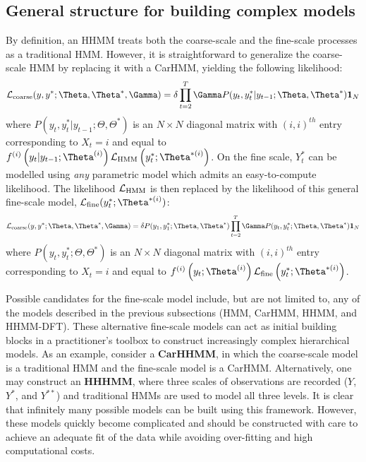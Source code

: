 
\subsection{General structure for building complex models}

By definition, an HHMM treats both the coarse-scale and the fine-scale processes as a traditional HMM. However, it is straightforward to generalize the coarse-scale HMM by replacing it with a CarHMM, yielding the following likelihood:
\[
\calL_{\text{coarse}}(y,y^*;\Theta,\Theta^*,\Gamma) = \delta \prod_{t=2}^T \Gamma P(y_t,y^*_t|y_{t-1};\Theta,\Theta^*) \mathbf{1}_N
\]
where $P(y_t,y^*_t|y_{t-1};\Theta,\Theta^*) $ is an $N \times N$ diagonal matrix with $(i,i)^{th}$ entry corresponding to $X_t=i$ and equal to $f^{(i)}\left(y_t|y_{t-1};\Theta^{(i)}\right)\calL_{\text{HMM}}\left(y^*_t;\Theta^{*(i)}\right)$. 
On the fine scale, $Y^*_t$ can be modelled using \textit{any} parametric model which admits an easy-to-compute likelihood. The likelihood $\mathcal{L}_{\text{HMM}}$ is then replaced by the likelihood of this general fine-scale model, $\calL_{\text{fine}}(y^*_t;\Theta^{*(i)})$:
\[
\calL_{\text{coarse}}(y,y^*;\Theta,\Theta^*,\Gamma) = \delta P(y_1,y^*_1;\Theta,\Theta^*) \prod_{t=2}^T \Gamma P(y_t,y^*_t;\Theta,\Theta^*) \mathbf{1}_N
\]
where $P(y_t,y^*_t;\Theta,\Theta^*) $ is an $N \times N$ diagonal matrix with $(i,i)^{th}$ entry corresponding to $X_t=i$ and equal to $f^{(i)}\left(y_t;\Theta^{(i)}\right)\calL_{\text{fine}}\left(y^*_t;\Theta^{*(i)}\right)$. 

Possible candidates for the fine-scale model include, but are not limited to, any of the models described in the previous subsections (HMM, CarHMM, HHMM, and HHMM-DFT). These alternative fine-scale models can act as initial building blocks in a practitioner's toolbox to construct increasingly complex hierarchical models. As an example, consider a \textbf{CarHHMM}, in which the coarse-scale model is a traditional HMM and the fine-scale model is a CarHMM. Alternatively, one may construct an \textbf{HHHMM}, where three scales of observations are recorded ($Y$, $Y^*$, and $Y^{**}$) and traditional HMMs are used to model all three levels. It is clear that infinitely many possible models can be built using this framework. However, these models quickly become complicated and should be constructed with care to achieve an adequate fit of the data while avoiding over-fitting and high computational costs.
